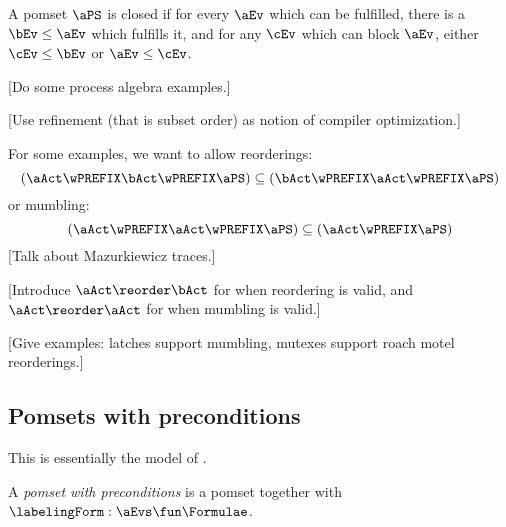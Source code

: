 \begin{definition}
  A pomset $\aPS$ is closed if
  for every $\aEv$ which can be fulfilled,
  there is a $\bEv\le\aEv$ which fulfills it,
  and for any $\cEv$ which can block $\aEv$, either $\cEv\le\bEv$ or $\aEv\le\cEv$. 
\end{definition}

[Do some process algebra examples.]

[Use refinement (that is subset order) as notion of compiler optimization.]

For some examples, we want to allow reorderings:
\[
  (\aAct \wPREFIX \bAct \wPREFIX \aPS)
\subseteq
  (\bAct \wPREFIX \aAct \wPREFIX \aPS)
\]
or mumbling:
\[
  (\aAct \wPREFIX \aAct \wPREFIX \aPS)
\subseteq
  (\aAct \wPREFIX \aPS)
\]
[Talk about Mazurkiewicz traces.]

[Introduce $\aAct\reorder\bAct$ for when reordering is valid,
  and  $\aAct\reorder\aAct$ for when mumbling is valid.]

[Give examples: latches support mumbling, mutexes support roach motel reorderings.]

\subsection{Pomsets with preconditions}

This is essentially the model of \cite{10.1145/3428262}.

\begin{definition}
  A \emph{pomset with preconditions} is
  a pomset together with $\labelingForm:\aEvs\fun\Formulae$.
\end{definition}

